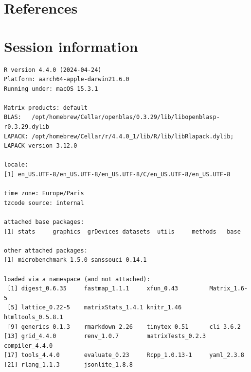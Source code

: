 \documentclass[
  11pt,
  a4paper,
]{article}
\theoremstyle{definition}
\theoremstyle{plain}
\theoremstyle{plain}
\theoremstyle{plain}
\theoremstyle{definition}
\theoremstyle{remark}
\begin{document}
\section*{References}\label{references}

\renewcommand{\bibsection}{}


\section*{Session information}\label{session-information}

\begin{verbatim}
R version 4.4.0 (2024-04-24)
Platform: aarch64-apple-darwin21.6.0
Running under: macOS 15.3.1

Matrix products: default
BLAS:   /opt/homebrew/Cellar/openblas/0.3.29/lib/libopenblasp-r0.3.29.dylib 
LAPACK: /opt/homebrew/Cellar/r/4.4.0_1/lib/R/lib/libRlapack.dylib;  LAPACK version 3.12.0

locale:
[1] en_US.UTF-8/en_US.UTF-8/en_US.UTF-8/C/en_US.UTF-8/en_US.UTF-8

time zone: Europe/Paris
tzcode source: internal

attached base packages:
[1] stats     graphics  grDevices datasets  utils     methods   base     

other attached packages:
[1] microbenchmark_1.5.0 sanssouci_0.14.1    

loaded via a namespace (and not attached):
 [1] digest_0.6.35     fastmap_1.1.1     xfun_0.43         Matrix_1.6-5     
 [5] lattice_0.22-5    matrixStats_1.4.1 knitr_1.46        htmltools_0.5.8.1
 [9] generics_0.1.3    rmarkdown_2.26    tinytex_0.51      cli_3.6.2        
[13] grid_4.4.0        renv_1.0.7        matrixTests_0.2.3 compiler_4.4.0   
[17] tools_4.4.0       evaluate_0.23     Rcpp_1.0.13-1     yaml_2.3.8       
[21] rlang_1.1.3       jsonlite_1.8.8   
\end{verbatim}
\end{document}
